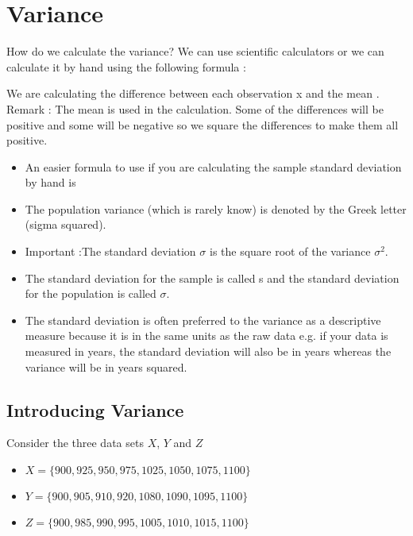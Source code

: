 

\section{Variance}
How do we calculate the variance? We can use scientific calculators or we can calculate it by hand using the following formula :


We are calculating the difference between each observation x and the mean . 
Remark : The mean is used in the calculation.
Some of the differences will be positive and some will be negative so we square the differences to make them all positive.




\begin{itemize}
\item An easier formula to use if you are calculating the sample standard deviation by hand is
\item The population variance (which is rarely know) is denoted by the Greek letter   (sigma squared).
\item Important :The standard deviation $\sigma$ is the square root of the variance $\sigma^2$.

\item The standard deviation for the sample is called s and the standard deviation for the population is called $\sigma$.
\item The standard deviation is often preferred to the variance as a descriptive measure because it is in the same units as the raw data e.g. if your data is measured in years, the standard deviation will also be in years whereas the variance will be in years squared.
\end{itemize}





\subsection{Introducing Variance}

Consider the three data sets $X$, $Y$ and $Z$
\begin{itemize}
\item $X= \{900,925,950,975,1025,1050,1075,1100 \}$
\item $Y=\{900,905,910,920,1080,1090,1095,1100\}$
\item $Z=\{900,985,990,995,1005,1010,1015,1100\}$
\end{itemize}

